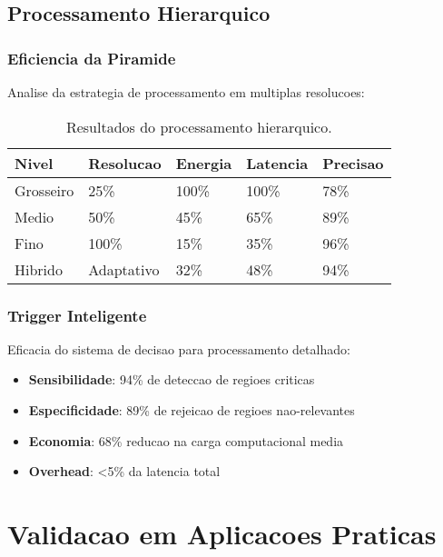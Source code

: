 \subsection{Processamento Hierarquico}

\subsubsection{Eficiencia da Piramide}
Analise da estrategia de processamento em multiplas resolucoes:

\begin{table}[!htp]
\caption[Processamento Hierarquico]{Resultados do processamento hierarquico.}
\label{tab:hierarquico_resultados}
\begin{center}
\begin{tabular}{|p{2.5cm}|p{2cm}|p{2cm}|p{2cm}|p{2cm}|}
\hline
\textbf{Nivel} & \textbf{Resolucao} & \textbf{Energia} & \textbf{Latencia} & \textbf{Precisao} \\
\hline
Grosseiro & 25\% & 100\% & 100\% & 78\% \\
\hline
Medio & 50\% & 45\% & 65\% & 89\% \\
\hline
Fino & 100\% & 15\% & 35\% & 96\% \\
\hline
Hibrido & Adaptativo & 32\% & 48\% & 94\% \\
\hline
\end{tabular}
\end{center}
\end{table}

\subsubsection{Trigger Inteligente}
Eficacia do sistema de decisao para processamento detalhado:

\begin{itemize}
    \item \textbf{Sensibilidade}: 94\% de deteccao de regioes criticas
    \item \textbf{Especificidade}: 89\% de rejeicao de regioes nao-relevantes
    \item \textbf{Economia}: 68\% reducao na carga computacional media
    \item \textbf{Overhead}: <5\% da latencia total
\end{itemize}

\section{Validacao em Aplicacoes Praticas}\label{sec:validacao_aplicacoes}

